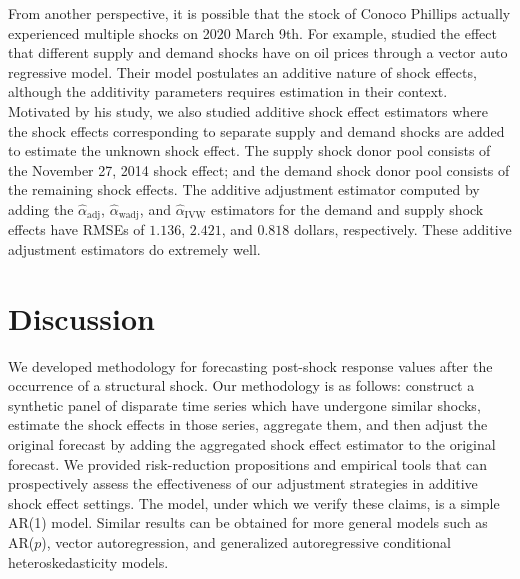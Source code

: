 \documentclass[11pt]{article}
\theoremstyle{definition}
\begin{document}
From another perspective, it is possible that the stock of Conoco Phillips actually experienced multiple shocks on 2020 March 9th. For example, \citet{kilian2009not} studied the effect that different supply and demand shocks have on oil prices through a vector auto regressive model. Their model postulates an additive nature of shock effects, although the additivity parameters requires estimation in their context. Motivated by his study, we also studied additive shock effect estimators where the shock effects corresponding to separate supply and demand shocks are added to estimate the unknown shock effect. The supply shock donor pool consists of the November 27, 2014 shock effect; and the demand shock donor pool consists of the remaining shock effects. The additive adjustment estimator computed by adding the $\hat{\alpha}_{\text{adj}}$, $\hat{\alpha}_{\text{wadj}}$, and $\hat{\alpha}_{\text{IVW}}$ estimators for the demand and supply shock effects have  RMSEs of $1.136$, $2.421$, and $0.818$ dollars, respectively. These additive adjustment estimators do extremely well. 






\section{Discussion}
\label{discussion}

We developed methodology for forecasting post-shock response values after the occurrence of a structural shock. Our methodology is as follows: construct a synthetic panel of disparate time series which have undergone similar shocks, estimate the shock effects in those series, aggregate them, and then adjust the original forecast by adding the aggregated shock effect estimator to the original forecast. We provided risk-reduction propositions and empirical tools that can prospectively assess the effectiveness of our adjustment strategies in additive shock effect settings. The model, under which we verify these claims, is a simple AR(1) model. Similar results can be obtained for more general models such as AR($p$), vector autoregression, and generalized autoregressive conditional heteroskedasticity models. %
\end{document}
